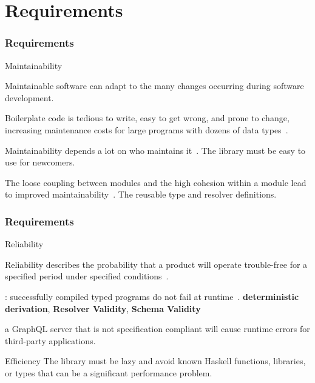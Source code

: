 \section{Requirements}

\begin{frame}\frametitle{Requirements}  

\begin{alertblock}{Maintainability}

Maintainable software can adapt to the many changes occurring during software development.~\cite{requirements-change-1,view-of-web, sof-sus-institute-maintainability}


\begin{itemize}

     Boilerplate code is tedious to write, easy to get wrong, and prone to change, increasing maintenance costs for large programs with dozens of data types~\cite{scrap-your-boilerplate}.

     Maintainability depends a lot on who maintains it~\cite{contr-reduce-maintainability}. The library must be easy to use for newcomers.

    The loose coupling between modules and the high cohesion within a module lead to improved maintainability~\cite{arc-modularity}.
    The reusable type and resolver definitions. 
    
\end{itemize}
\end{alertblock}
\end{frame}

\begin{frame}\frametitle{Requirements}  

\begin{block}{Reliability}

Reliability describes the probability that a product will operate trouble-free for a specified period under specified conditions~\cite{optimal-release-time}.

\begin{itemize}
    : successfully compiled typed programs do not fail at runtime~\cite{milner-well-typed,wadler-well-typed}.  \textbf{deterministic derivation}, \textbf{Resolver Validity}, \textbf{Schema Validity}
    
     a GraphQL server that is not specification compliant will cause runtime errors for third-party applications.
\end{itemize}

\end{block}

\begin{block}{Efficiency}
The library must be lazy and avoid known Haskell functions, libraries, or types that can be a significant performance problem.
\end{block}

\end{frame}